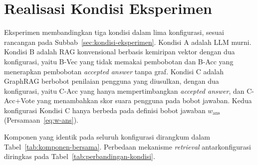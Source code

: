 \section{Realisasi Kondisi Eksperimen}
\label{sec:implementasi-kondisi}

Eksperimen membandingkan tiga kondisi dalam lima konfigurasi, sesuai rancangan pada Subbab~\ref{sec:kondisi-eksperimen}. Kondisi A adalah LLM murni. Kondisi B adalah RAG konvensional berbasis kemiripan vektor dengan dua konfigurasi, yaitu B-Vec yang tidak memakai pembobotan dan B-Acc yang menerapkan pembobotan \emph{accepted answer} tanpa graf. Kondisi C adalah GraphRAG berbobot penilaian pengguna yang diusulkan, dengan dua konfigurasi, yaitu C-Acc yang hanya mempertimbangkan \emph{accepted answer}, dan C-Acc+Vote yang menambahkan skor suara pengguna pada bobot jawaban. Kedua konfigurasi Kondisi C hanya berbeda pada definisi bobot jawaban $w_{\mathrm{ans}}$ (Persamaan~\eqref{eq:w-ans}).

Komponen yang identik pada seluruh konfigurasi dirangkum dalam Tabel~\ref{tab:komponen-bersama}. Perbedaan mekanisme \emph{retrieval} antarkonfigurasi diringkas pada Tabel~\ref{tab:perbandingan-kondisi}.

